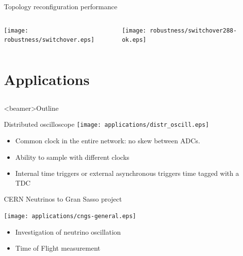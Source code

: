 \documentclass[compress,red]{beamer}
\begin{document}
\begin{frame}{Topology reconfiguration performance}

\begin{columns}[c]

    \begin{center}
    \texttt{[image: robustness/switchover.eps]} 
    \end{center}

    \begin{center}
    \texttt{[image: robustness/switchover288-ok.eps]}
    \end{center}

\end{columns}
\end{frame}

\section{Applications}
\subsection{}
\begin{frame}<beamer>{Outline}
    \tableofcontents [currentsection]
\end{frame}

\begin{frame}{Distributed oscilloscope}
  \texttt{[image: applications/distr\_oscill.eps]}
  \begin{block}{}
    \begin{itemize}
      \item Common clock in the entire network: no skew between ADCs.
      \item Ability to sample with different clocks
      \item Internal time triggers or external asynchronous triggers time tagged
        with a TDC
    \end{itemize}
  \end{block}
\end{frame}

\begin{frame}{CERN Neutrinos to Gran Sasso project}
  \begin{center}
    \texttt{[image: applications/cngs-general.eps]}
  \end{center}
  \begin{itemize}
    \item Investigation of neutrino oscillation
    \item Time of Flight measurement
  \end{itemize}
\end{frame}
\end{document}
